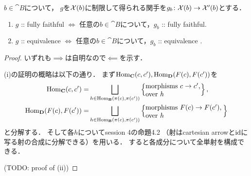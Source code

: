     \begin{Prop}
        $b \in \cat{B}$について，
        $g$を$\mathcal{X}(b)$に制限して得られる関手を$g_b \colon \mathcal{X}(b) \to \mathcal{X}'(b)$とする．
        \begin{enumerate}[label=(\alph*)]
        \item $g$ :: fully faithful
                $\iff$ 任意の$b \in \cat{B}$について，$g_{b}$ :: fully faithful.
        \item $g$ :: equivalence
                $\iff$ 任意の$b \in \cat{B}$について，$g_{b}$ :: equivalence
                    .
    \end{enumerate}
    \end{Prop}
    \begin{proof}
        いずれも$\implies$は自明なので$\impliedby$を示す．

        (i)の証明の概略は以下の通り．
        まず$\operatorname{Hom}_{\mathbf{C}}(c, c'), \operatorname{Hom}_{\mathbf{D}}(F(c), F(c'))$を
        \begin{align*}
            \Hom_{\cat{C}}(c, c')
            =&\bigsqcup_{h \in \Hom_{\cat{B}}(\pi(c), \pi(c'))}
            \left\{\parbox{2.85cm}{morphisms $c \to c'$, \\ \qquad\ \ over $h$}\right\}, \\
            \Hom_{\cat{D}}(F(c), F(c'))
            =&\bigsqcup_{h \in \Hom_{\cat{B}}(\pi(c), \pi(c'))}
            \left\{\parbox{4cm}{morphisms $F(c) \to F(c')$, \\ \qquad\qquad\ over $h$}\right\}
        \end{align*}
        と分解する．
        そして各$h$についてsession 4の命題4.2
        （射はcartesian arrowと$\mathrm{id}_{\!}$に写る射の合成に分解できる）を用いる．
        すると各成分について全単射を構成できる．

        (TODO: proof of (ii))
    \end{proof}

\printbibliography[title=参考文献]

